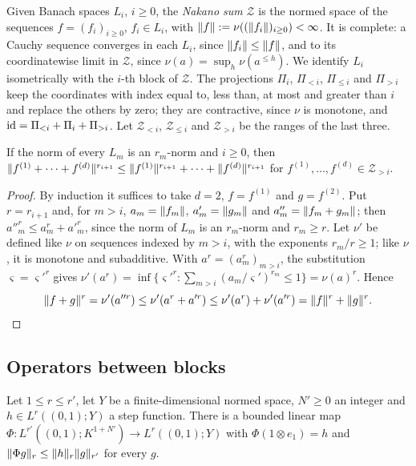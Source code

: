 Given Banach spaces $L_i$, $i\ge0$, the \emph{Nakano sum} $\mathcal Z$ is the normed space of the sequences
$f=(f_i)_{i\ge0}$, $f_i\in L_i$, with $\lVert f\rVert:=\nu((\lVert f_i\rVert)_{i\ge0})<\infty$. It is complete: a Cauchy sequence
converges in each $L_i$, since $\lVert f_i\rVert\le\lVert f\rVert$, and to its coordinatewise limit in $\mathcal Z$, since
$\nu(a)=\sup_h\nu(a^{\le h})$. We identify $L_i$ isometrically with the $i$\nobreakdash-th block of $\mathcal Z$. The
projections $\Pi_i$, $\Pi_{<i}$, $\Pi_{\le i}$ and $\Pi_{>i}$ keep the coordinates with index equal to, less than, at
most and greater than $i$ and replace the others by zero; they are contractive, since $\nu$ is monotone, and
$\mathrm{id}=\Pi_{<i}+\Pi_i+\Pi_{>i}$. Let $\mathcal Z_{<i}$, $\mathcal Z_{\le i}$ and $\mathcal Z_{>i}$ be the ranges of the
last three.

\begin{lemma}\label{rig:lem:nakano}
If the norm of every $L_m$ is an $r_m$\nobreakdash-norm and $i\ge0$, then
$\lVert f^{(1)}+\dots+f^{(d)}\rVert^{r_{i+1}}\le\lVert f^{(1)}\rVert^{r_{i+1}}+\dots+\lVert f^{(d)}\rVert^{r_{i+1}}$ for
$f^{(1)},\dots,f^{(d)}\in\mathcal Z_{>i}$.
\end{lemma}

\begin{proof}
By induction it suffices to take $d=2$, $f=f^{(1)}$ and $g=f^{(2)}$. Put $r=r_{i+1}$ and, for $m>i$, $a_m=\lVert f_m\rVert$,
$a'_m=\lVert g_m\rVert$ and $a''_m=\lVert f_m+g_m\rVert$; then $a''^r_m\le a^r_m+a'^r_m$, since the norm of $L_m$ is an
$r_m$\nobreakdash-norm and $r_m\ge r$. Let $\nu'$ be defined like $\nu$ on sequences indexed by $m>i$, with the
exponents $r_m/r\ge1$; like $\nu$, it is monotone and subadditive. With $a^r=(a^r_m)_{m>i}$, the substitution
$\varsigma=\varsigma'^r$ gives $\nu'(a^r)=\inf\{\varsigma'^r:\sum_{m>i}(a_m/\varsigma')^{r_m}\le1\}=\nu(a)^r$. Hence
\[
 \lVert f+g\rVert^r=\nu'(a''^r)\le\nu'(a^r+a'^r)\le\nu'(a^r)+\nu'(a'^r)=\lVert f\rVert^r+\lVert g\rVert^r.
\]
\end{proof}

\subsection{Operators between blocks}\label{rig:ssec:operators}

\begin{lemma}\label{rig:lem:rolewicz}
Let $1\le r\le r'$, let $Y$ be a finite-dimensional normed space, $N'\ge0$ an integer and $h\in L^r((0,1);Y)$ a step
function. There is a bounded linear map $\Phi\colon L^{r'}((0,1);K^{1+N'})\to L^r((0,1);Y)$ with
$\Phi(1\otimes e_1)=h$ and $\lVert \Phi g\rVert_r\le\lVert h\rVert_r\lVert g\rVert_{r'}$ for every $g$.
\end{lemma}

